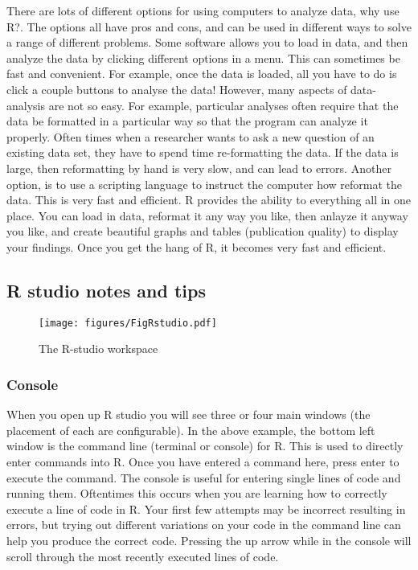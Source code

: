 \documentclass[
]{book}
\begin{document}
There are lots of different options for using computers to analyze data, why use R?. The options all have pros and cons, and can be used in different ways to solve a range of different problems. Some software allows you to load in data, and then analyze the data by clicking different options in a menu. This can sometimes be fast and convenient. For example, once the data is loaded, all you have to do is click a couple buttons to analyse the data! However, many aspects of data-analysis are not so easy. For example, particular analyses often require that the data be formatted in a particular way so that the program can analyze it properly. Often times when a researcher wants to ask a new question of an existing data set, they have to spend time re-formatting the data. If the data is large, then reformatting by hand is very slow, and can lead to errors. Another option, is to use a scripting language to instruct the computer how reformat the data. This is very fast and efficient. R provides the ability to everything all in one place. You can load in data, reformat it any way you like, then anlayze it anyway you like, and create beautiful graphs and tables (publication quality) to display your findings. Once you get the hang of R, it becomes very fast and efficient.

\hypertarget{r-studio-notes-and-tips}{%
\subsection{R studio notes and tips}\label{r-studio-notes-and-tips}}

\begin{figure}
\centering
\texttt{[image: figures/FigRstudio.pdf]}
\caption{\label{fig:2rstudiod}The R-studio workspace}
\end{figure}

\hypertarget{console}{%
\subsubsection{Console}\label{console}}

When you open up R studio you will see three or four main windows (the placement of each are configurable). In the above example, the bottom left window is the command line (terminal or console) for R. This is used to directly enter commands into R. Once you have entered a command here, press enter to execute the command. The console is useful for entering single lines of code and running them. Oftentimes this occurs when you are learning how to correctly execute a line of code in R. Your first few attempts may be incorrect resulting in errors, but trying out different variations on your code in the command line can help you produce the correct code. Pressing the up arrow while in the console will scroll through the most recently executed lines of code.
\end{document}
